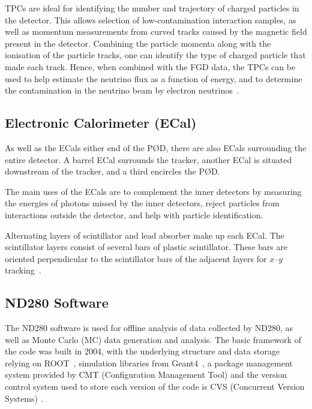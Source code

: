 \documentclass[aps,pra,12pt,notitlepage,tightenlines]{revtex4-1}
\begin{document}
TPCs are ideal for identifying the number and trajectory of charged particles in the detector. This allows selection of low-contamination interaction samples, as well as momentum measurements from curved tracks caused by the magnetic field present in the detector. Combining the particle momenta along with the ionisation of the particle tracks, one can identify the type of charged particle that made each track. Hence, when combined with the FGD data, the TPCs can be used to help estimate the neutrino flux as a function of energy, and to determine the contamination in the neutrino beam by electron neutrinos~\cite{ABE2011106, Abgrall:2010hi}.

\subsection{Electronic Calorimeter (ECal)}
As well as the ECals either end of the P\O D, there are also ECals surrounding the entire detector. A barrel ECal surrounds the tracker, another ECal is situated downstream of the tracker, and a third encircles the P\O D. %

The main uses of the ECals are to complement the inner detectors by measuring the energies of photons missed by the inner detectors, reject particles from interactions outside the detector, and help with particle identification.

Alternating layers of scintillator and lead absorber make up each ECal. The scintillator layers consist of several bars of plastic scintillator. These bars are oriented perpendicular to the scintillator bars of the adjacent layers for $x$--$y$ tracking~\cite{ABE2011106, Allan:2013ofa}.

\subsection{ND280 Software}
The ND280 software is used for offline analysis of data collected by ND280, as well as Monte Carlo (MC) data generation and analysis. The basic framework of the code was built in 2004, with the underlying structure and data storage relying on ROOT~\cite{Brun1997}, simulation libraries from Geant4~\cite{Agostinelli2003}, a package management system provided by CMT (Configuration Management Tool) \cite{Arnault:2000vu} and the version control system used to store each version of the code is CVS (Concurrent Version Systems) \cite{Berliner2001}.
\end{document}
